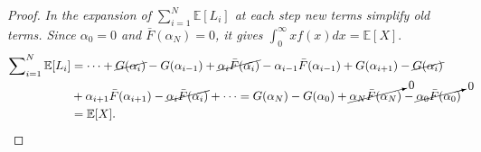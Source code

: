 \renewcommand{\qedsymbol}{\rule{0.5em}{0.5em}}
\begin{proof}
\label{proof}
\textit{In the expansion of $\sum _{i=1}^{N}\mathbb{E}[L_i]$ at each step new terms simplify old terms. Since $\alpha_{\mathit{0}} = 0$ and $\bar{F}(\alpha_N) = 0$, it gives $\int_{0}^\infty x f(x) dx = \mathbb{E}[X]$}.
\small
\begin{align*}
	\sum\nolimits_{i=1}^{N}\mathbb{E}[L_i] &= \cdots + \cancel{G(\alpha_i)} - G(\alpha_{i-1}) + \cancel{\alpha_i \bar{F}(\alpha_i)} 
	-\alpha_{i-1}\bar{F}(\alpha_{i-1}) + G(\alpha_{i+1}) - \cancel{G(\alpha_{i})} \\ &+ \alpha_{i+1} \bar{F}(\alpha_{i+1})- \cancel{\alpha_{i}\bar{F}(\alpha_{i})} + \cdots 
	=G(\alpha_N) - G(\alpha_0) + \cancelto{0}{\alpha_N \bar{F}(\alpha_N)} -\cancelto{0}{\alpha_0\bar{F}(\alpha_0)} \\
	&=\mathbb{E}[X].
\end{align*}
\normalsize
\end{proof}